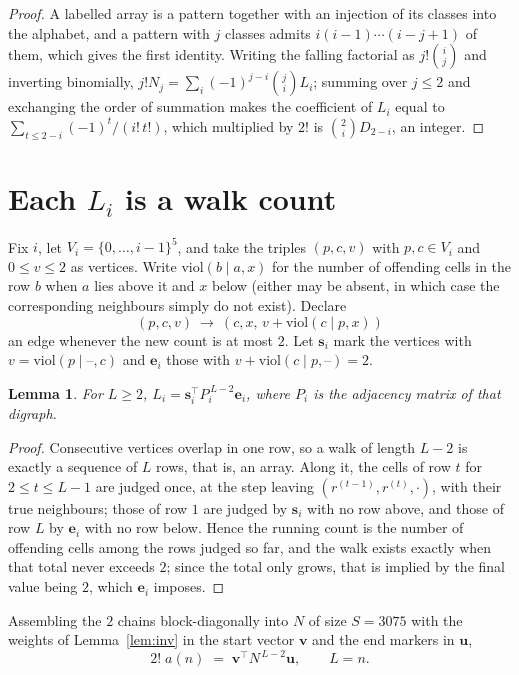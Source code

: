 \documentclass[11pt,a4paper]{article}
\theoremstyle{plain}
\newtheorem{lemma}[theorem]{Lemma}
\theoremstyle{definition}
\begin{document}
\begin{proof}
A labelled array is a pattern together with an injection of its classes into the alphabet,
and a pattern with $j$ classes admits $i(i-1)\cdots(i-j+1)$ of them, which gives the first
identity. Writing the falling factorial as $j!\binom{i}{j}$ and inverting binomially,
$j!N_j=\sum_i(-1)^{j-i}\binom{j}{i}L_i$; summing over $j\le2$ and exchanging the
order of summation makes the coefficient of $L_i$ equal to
$\sum_{t\le2-i}(-1)^t/(i!\,t!)$, which multiplied by $2!$ is
$\binom{2}{i}D_{2-i}$, an integer.
\end{proof}

\section{Each $L_i$ is a walk count}

Fix $i$, let $V_i=\{0,\dots,i-1\}^{5}$, and take the triples $(p,c,v)$ with
$p,c\in V_i$ and $0\le v\le2$ as vertices. Write $\mathrm{viol}(b\mid a,x)$ for the number
of offending cells in the row $b$ when $a$ lies above it and $x$ below (either may be
absent, in which case the corresponding neighbours simply do not exist). Declare
\[
(p,c,v)\ \longrightarrow\ (c,x,\,v+\mathrm{viol}(c\mid p,x))
\]
an edge whenever the new count is at most $2$. Let $\mathbf{s}_i$ mark the vertices with
$v=\mathrm{viol}(p\mid\text{--},c)$ and $\mathbf{e}_i$ those with
$v+\mathrm{viol}(c\mid p,\text{--})=2$.

\begin{lemma}\label{lem:walk}
For $L\ge2$, $L_i=\mathbf{s}_i^{\!\top}P_i^{\,L-2}\mathbf{e}_i$, where $P_i$ is the
adjacency matrix of that digraph.
\end{lemma}

\begin{proof}
Consecutive vertices overlap in one row, so a walk of length $L-2$ is exactly a sequence
of $L$ rows, that is, an array. Along it, the cells of row $t$ for $2\le t\le L-1$ are
judged once, at the step leaving $(r^{(t-1)},r^{(t)},\cdot)$, with their true neighbours;
those of row $1$ are judged by $\mathbf{s}_i$ with no row above, and those of row
$L$ by $\mathbf{e}_i$ with no row below. Hence the running count is the number of
offending cells among the rows judged so far, and the walk exists exactly when that total
never exceeds $2$; since the total only grows, that is implied by the final value being
$2$, which $\mathbf{e}_i$ imposes.
\end{proof}

Assembling the $2$ chains block-diagonally into $N$ of size $S=3075$ with the weights of
Lemma~\ref{lem:inv} in the start vector $\mathbf{v}$ and the end markers in
$\mathbf{u}$,
\begin{equation}\label{eq:walk2}
2!\;a(n)\;=\;\mathbf{v}^{\!\top}N^{\,L-2}\mathbf{u},\qquad L=n .
\end{equation}
\end{document}
